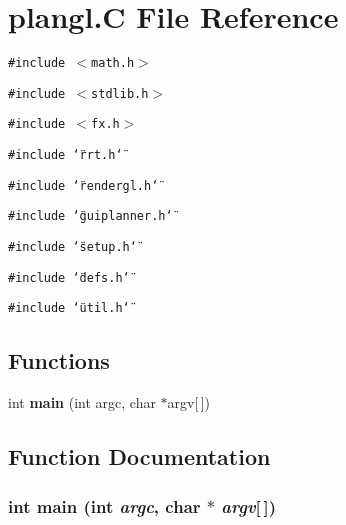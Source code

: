 \section{plangl.C File Reference}
\label{plangl_8C}
{\tt \#include $<$math.h$>$}\par
{\tt \#include $<$stdlib.h$>$}\par
{\tt \#include $<$fx.h$>$}\par
{\tt \#include \char`\"{}rrt.h\char`\"{}}\par
{\tt \#include \char`\"{}rendergl.h\char`\"{}}\par
{\tt \#include \char`\"{}guiplanner.h\char`\"{}}\par
{\tt \#include \char`\"{}setup.h\char`\"{}}\par
{\tt \#include \char`\"{}defs.h\char`\"{}}\par
{\tt \#include \char`\"{}util.h\char`\"{}}\par
\subsection*{Functions}
\begin{CompactItemize}
\item 
int {\bf main} (int argc, char $\ast$argv[$\,$])
\end{CompactItemize}


\subsection{Function Documentation}
\subsubsection{\setlength{\rightskip}{0pt plus 5cm}int main (int {\em argc}, char $\ast$ {\em argv}[$\,$])}\label{plangl_8C_a0}


